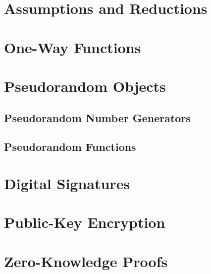 \documentclass[../../../main.tex]{subfiles}
\begin{document}

\section{Assumptions and Reductions}
\section{One-Way Functions}
\section{Pseudorandom Objects}
\subsection{Pseudorandom Number Generators}
\subsection{Pseudorandom Functions}
\section{Digital Signatures}
\section{Public-Key Encryption}
\section{Zero-Knowledge Proofs}

\printbibliography[
    heading=subbibintoc,
    title={References}
]
\end{document}
